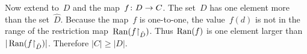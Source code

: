\documentclass{ibl}
\begin{document}
\begin{ex}
\begin{ans}
\begin{exes}
  Now extend to~$D$ and the map~$\mbox{$f\colon D\to C$}$.
  The set~$D$ has one element more than the set~$\hat{D}$.
  Because the map~$f$ is one-to-one, the value~$f(d)$ is not in 
  the range of the restriction map~$\operatorname{Ran}({f}\mathord\upharpoonright_{\hat{D}})$.
  Thus $\operatorname{Ran}(f)$ is one element larger than
  $|\operatorname{Ran}({f}\mathord\upharpoonright_{\hat{D}})|$.
  Therefore $|C|\geq|D|$.
\end{exes}
\end{ans}
\end{ex}



\end{document}
